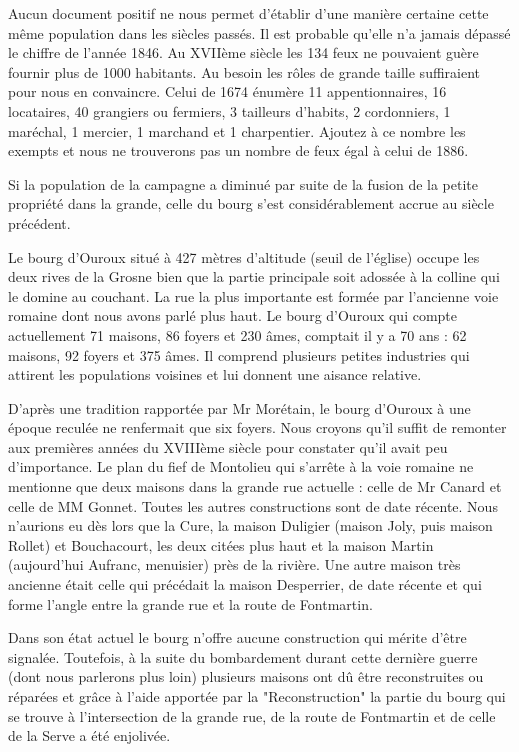 Aucun document positif ne nous permet d'établir d'une manière certaine cette même population dans les siècles passés. Il est probable qu'elle n'a jamais dépassé le chiffre de l'année 1846. Au XVIIème siècle les 134 feux ne pouvaient guère fournir plus de 1000 habitants. Au besoin les rôles de grande taille suffiraient pour nous en convaincre. Celui de 1674 énumère 11 appentionnaires, 16 locataires, 40 grangiers ou fermiers, 3 tailleurs d'habits, 2 cordonniers, 1 maréchal, 1 mercier, 1 marchand et 1 charpentier. Ajoutez à ce nombre les exempts et nous ne trouverons pas un nombre de feux égal à celui de 1886.

Si la population de la campagne a diminué par suite de la fusion de la petite propriété dans la grande, celle du bourg s'est considérablement accrue au siècle précédent.

Le bourg d'Ouroux situé à 427 mètres d'altitude (seuil de l'église) occupe les deux rives de la Grosne bien que la partie principale soit adossée à la colline qui le domine au couchant. La rue la plus importante est formée par l'ancienne voie romaine dont nous avons parlé plus haut. Le bourg d'Ouroux qui compte actuellement 71 maisons, 86 foyers et 230 âmes, comptait il y a 70 ans : 62 maisons, 92 foyers et 375 âmes. Il comprend plusieurs petites industries qui attirent les populations voisines et lui donnent une aisance relative.

D'après une tradition rapportée par Mr Morétain, le bourg d'Ouroux à une époque reculée ne renfermait que six foyers. Nous croyons qu'il suffit de remonter aux premières années du XVIIIème siècle pour constater qu'il avait peu d'importance. Le plan du fief de Montolieu qui s'arrête à la voie romaine ne mentionne que deux maisons dans la grande rue actuelle : celle de Mr Canard et celle de MM Gonnet. Toutes les autres constructions sont de date récente. Nous n'aurions eu dès lors que la Cure, la maison Duligier (maison Joly,
puis maison Rollet) et Bouchacourt, les deux citées plus haut et la maison Martin (aujourd'hui Aufranc, menuisier) près de la rivière. Une autre maison très ancienne était celle qui précédait la maison Desperrier, de date récente et qui forme l'angle entre la grande rue et la route de Fontmartin.

Dans son état actuel le bourg n'offre aucune construction qui mérite d'être signalée. Toutefois, à la suite du bombardement durant cette dernière guerre (dont nous parlerons plus loin) plusieurs maisons ont dû être reconstruites ou réparées et grâce à l'aide apportée par la "Reconstruction" la partie du bourg qui se trouve à l'intersection de la grande rue, de la route de Fontmartin et de celle de la Serve a été enjolivée.

